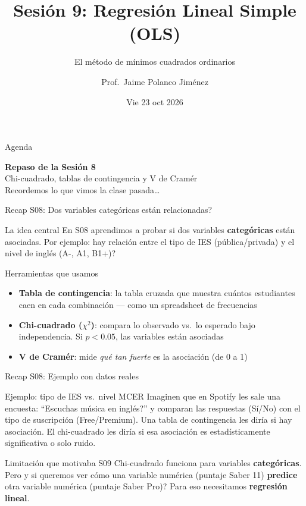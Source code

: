 \documentclass[aspectratio=169, 11pt]{beamer}
\title{Sesión 9: Regresión Lineal Simple (OLS)}
\subtitle{El método de mínimos cuadrados ordinarios}
\author{Prof.\ Jaime Polanco Jim\'enez}
\date{Vie 23 oct 2026}
\begin{document}
\begin{frame}
\titlepage
\end{frame}

\begin{frame}{Agenda}
\tableofcontents
\end{frame}

\begin{frame}{}
\vfill
\centering
{\Large\textbf{Repaso de la Sesi\'on 8}}\\[1em]
{\normalsize Chi-cuadrado, tablas de contingencia y V de Cram\'er}\\[0.5em]
{\small Recordemos lo que vimos la clase pasada\ldots}
\vfill
\end{frame}

\begin{frame}{Recap S08: \textquestiondown{}Dos variables categ\'oricas est\'an relacionadas?}
\begin{exampleblock}{La idea central}
\small
En S08 aprendimos a probar si dos variables \textbf{categ\'oricas} est\'an asociadas. Por ejemplo: \textquestiondown{}hay relaci\'on entre el tipo de IES (p\'ublica/privada) y el nivel de ingl\'es (A-, A1, B1+)?
\end{exampleblock}

\begin{block}{Herramientas que usamos}
\begin{itemize}\setlength{\itemsep}{2pt}
  \item \textbf{Tabla de contingencia}: la tabla cruzada que muestra cu\'antos estudiantes caen en cada combinaci\'on --- como un spreadsheet de frecuencias
  \item \textbf{Chi-cuadrado ($\chi^2$)}: compara lo observado vs.\ lo esperado bajo independencia. Si $p < 0.05$, las variables est\'an asociadas
  \item \textbf{V de Cram\'er}: mide \textit{qu\'e tan fuerte} es la asociaci\'on (de 0 a 1)
\end{itemize}
\end{block}
\end{frame}

\begin{frame}{Recap S08: Ejemplo con datos reales}
\begin{exampleblock}{Ejemplo: tipo de IES vs.\ nivel MCER}
\small
Imaginen que en Spotify les sale una encuesta: ``\textquestiondown{}Escuchas m\'usica en ingl\'es?'' y comparan las respuestas (S\'i/No) con el tipo de suscripci\'on (Free/Premium). Una tabla de contingencia les dir\'ia si hay asociaci\'on. El chi-cuadrado les dir\'ia si esa asociaci\'on es estad\'isticamente significativa o solo ruido.
\end{exampleblock}

\begin{alertblock}{Limitaci\'on que motivaba S09}
\small
Chi-cuadrado funciona para variables \textbf{categ\'oricas}. Pero \textquestiondown{}y si queremos ver c\'omo una variable num\'erica (puntaje Saber 11) \textbf{predice} otra variable num\'erica (puntaje Saber Pro)? Para eso necesitamos \textbf{regresi\'on lineal}.
\end{alertblock}
\end{frame}
\end{document}
